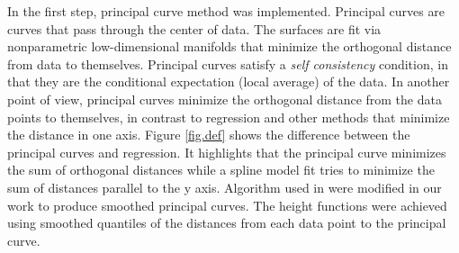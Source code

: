 \documentclass[12pt]{article}
\begin{document}
In the first step, principal curve method was implemented. Principal curves \cite{hastie1984principal} are curves that pass through the center of data. The surfaces are fit via nonparametric low-dimensional manifolds that minimize the orthogonal distance from data to themselves. Principal curves satisfy a {\em self consistency} condition, in that they are the conditional expectation (local average) of the data. In another point of view, principal curves minimize the orthogonal distance from the data points to themselves, in contrast to regression and other methods that minimize the distance in one axis. Figure \ref{fig.def} shows the difference between the principal curves and regression. It highlights that the principal curve minimizes the sum of orthogonal distances while a spline model fit tries to minimize the sum of distances parallel to the y axis. Algorithm used in \cite{hastie1989principal} were modified in our work to produce smoothed principal curves. The height functions were achieved using smoothed quantiles of the distances from each data point to the principal curve.\
\end{document}
